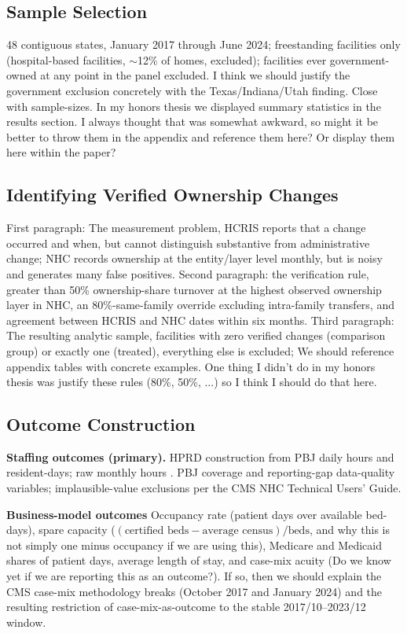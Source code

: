\documentclass[12pt]{article}
\begin{document}
\subsection{Sample Selection}

48 contiguous states, January 2017 through June 2024; freestanding facilities only (hospital-based facilities, $\sim$12\% of homes, excluded); facilities ever government-owned at any point in the panel excluded. I think we should justify the government exclusion concretely with the Texas/Indiana/Utah finding. Close with sample-sizes. In my honors thesis we displayed summary statistics in the results section. I always thought that was somewhat awkward, so might it be better to throw them in the appendix and reference them here? Or display them here within the paper?

\subsection{Identifying Verified Ownership Changes}

First paragraph: The measurement problem, HCRIS reports that a change occurred and when, but cannot distinguish substantive from administrative change; NHC records ownership at the entity/layer level monthly, but is noisy and generates many false positives. Second paragraph: the verification rule, greater than 50\% ownership-share turnover at the highest observed ownership layer in NHC, an 80\%-same-family override excluding intra-family transfers, and agreement between HCRIS and NHC dates within six months. Third paragraph: The resulting analytic sample, facilities with zero verified changes (comparison group) or exactly one (treated), everything else is excluded; We should reference appendix tables with concrete examples. One thing I didn't do in my honors thesis was justify these rules (80\%, 50\%, ...) so I think I should do that here. 

\subsection{Outcome Construction}

\noindent\textbf{Staffing outcomes (primary).} HPRD construction from PBJ daily hours and resident-days; raw monthly hours . PBJ coverage and reporting-gap data-quality variables; implausible-value exclusions per the CMS NHC Technical Users' Guide.

\medskip
\noindent\textbf{Business-model outcomes} Occupancy rate (patient days over available bed-days), spare capacity ($(\text{certified beds} - \text{average census})/\text{beds}$, and why this is not simply one minus occupancy if we are using this), Medicare and Medicaid shares of patient days, average length of stay, and case-mix acuity (Do we know yet if we are reporting this as an outcome?). If so, then we should explain the CMS case-mix methodology breaks (October 2017 and January 2024) and the resulting restriction of case-mix-as-outcome to the stable 2017/10--2023/12 window.
\end{document}
